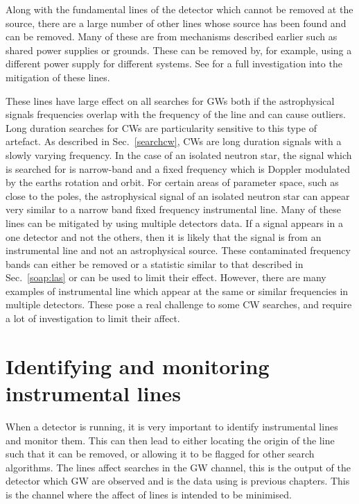 Along with the fundamental lines of the detector which cannot be removed at the source, there are a large number of other lines whose source has been found and can be removed. 
Many of these are from mechanisms described earlier such as shared power supplies or grounds. These can be removed by, for example, using a different power supply for different systems. See \citep{covas2018IdentificationMitigation} for a full investigation into the mitigation of these lines.

%

These lines have large effect on all searches for \glspl{GW} both if the astrophysical signals frequencies overlap with the frequency of the line and can cause outliers. 
Long duration searches for \glspl{CW} are particularity sensitive to this type of artefact.
As described in Sec.~\ref{searchcw}, \glspl{CW} are long duration signals with a slowly varying frequency.
In the case of an isolated neutron star, the signal which is searched for is narrow-band and a fixed frequency which is Doppler modulated by the earths rotation and orbit.
For certain areas of parameter space, such as close to the poles, the astrophysical signal of an isolated neutron star can appear very similar to a narrow band fixed frequency instrumental line. 
Many of these lines can be mitigated by using multiple detectors data. If a signal appears in a one detector and not the others, then it is likely that the signal is from an instrumental line and not an astrophysical source. 
These contaminated frequency bands can either be removed or a statistic similar to that described in Sec.~\ref{soap:las} or \citep{keitel2014SearchContinuous} can be used to limit their effect.
However, there are many examples of instrumental line which appear at the same or similar frequencies in multiple detectors.
These pose a real challenge to some \gls{CW} searches, and require a lot of investigation to limit their affect.

\section{\label{detchar:monitor}Identifying and monitoring instrumental lines}

%

When a detector is running, it is very important to identify instrumental lines and monitor them.
This can then lead to either locating the origin of the line such that it can be removed, or allowing it to be flagged for other search algorithms.
The lines affect searches in the \gls{GW} channel, this is the output of the detector which \gls{GW} are observed and is the data using is previous chapters.
This is the channel where the affect of lines is intended to be minimised.

